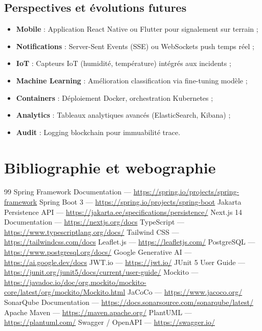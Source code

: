 \documentclass[12pt,a4paper,twoside,openright]{book}
\begin{document}
\section{Perspectives et évolutions futures}
\begin{itemize}
  \item \textbf{Mobile} : Application React Native ou Flutter pour signalement sur terrain ;
  \item \textbf{Notifications} : Server-Sent Events (SSE) ou WebSockets push temps réel ;
  \item \textbf{IoT} : Capteurs IoT (humidité, température) intégrés aux incidents ;
  \item \textbf{Machine Learning} : Amélioration classification via fine-tuning modèle ;
  \item \textbf{Containers} : Déploiement Docker, orchestration Kubernetes ;
  \item \textbf{Analytics} : Tableaux analytiques avancés (ElasticSearch, Kibana) ;
  \item \textbf{Audit} : Logging blockchain pour immuabilité trace.
\end{itemize}

\cleardoublepage
\chapter*{Bibliographie et webographie}
\begin{thebibliography}{99}
   Spring Framework Documentation — \url{https://spring.io/projects/spring-framework}
   Spring Boot 3 — \url{https://spring.io/projects/spring-boot}
   Jakarta Persistence API — \url{https://jakarta.ee/specifications/persistence/}
   Next.js 14 Documentation — \url{https://nextjs.org/docs}
   TypeScript — \url{https://www.typescriptlang.org/docs/}
   Tailwind CSS — \url{https://tailwindcss.com/docs}
   Leaflet.js — \url{https://leafletjs.com/}
   PostgreSQL — \url{https://www.postgresql.org/docs/}
   Google Generative AI — \url{https://ai.google.dev/docs}
   JWT.io — \url{https://jwt.io/}
   JUnit 5 User Guide — \url{https://junit.org/junit5/docs/current/user-guide/}
   Mockito — \url{https://javadoc.io/doc/org.mockito/mockito-core/latest/org/mockito/Mockito.html}
   JaCoCo — \url{https://www.jacoco.org/}
   SonarQube Documentation — \url{https://docs.sonarsource.com/sonarqube/latest/}
   Apache Maven — \url{https://maven.apache.org/}
   PlantUML — \url{https://plantuml.com/}
   Swagger / OpenAPI — \url{https://swagger.io/}
\end{thebibliography}
\end{document}
